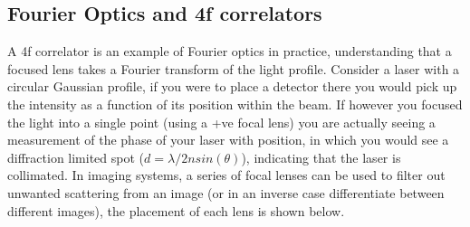 \subsection{Fourier Optics and 4f correlators}
A 4f correlator is an example of Fourier optics in practice, understanding
that a focused lens takes a Fourier transform of the light profile. 
Consider a laser with a circular Gaussian profile, if you were to place 
a detector there you would pick up the intensity as a function of its 
position within the beam. If however you focused the light into a single 
point (using a +ve focal lens) you are actually seeing a measurement of 
the phase of your laser with position, in which you would see a diffraction
limited spot ($d = \lambda/2nsin(\theta)$), indicating that the laser is 
collimated. In imaging systems, a series of focal lenses can be used to 
filter out unwanted scattering from an image (or in an inverse case 
differentiate between different images), the placement of each lens is 
shown below.
